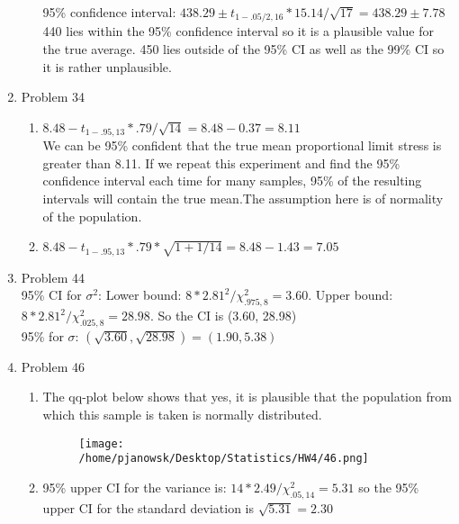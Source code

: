 \documentclass[11pt,letterpaper]{article}
\begin{document}
\begin{enumerate}
\begin{enumerate}
        95\% confidence interval: $438.29\pm t_{1-.05/2,16}*15.14/\sqrt{17} = 438.29\pm 7.78$\\
        440 lies within the 95\% confidence interval so it is a plausible value for the true average. 450 lies outside of the 95\% CI as well as the 99\% CI so it is rather unplausible.
    \end{enumerate}
\item Problem 34\\
    \begin{enumerate}
        \item $8.48- t_{1-.95,13}*.79/\sqrt{14} = 8.48-0.37 = 8.11$\\
        We can be 95\% confident that the true mean proportional limit stress is greater than 8.11. If we repeat this experiment and find the 95\% confidence interval each time for many samples, 95\% of the resulting intervals will contain the true mean.The assumption here is of normality of the population.
        \item $8.48- t_{1-.95,13}*.79*\sqrt{1+1/14} = 8.48-1.43 = 7.05$\\
    \end{enumerate}
\item Problem 44 \\
95\% CI for $\sigma^2$: Lower bound: $8*2.81^2/\chi^2_{.975,8}=3.60.$ Upper bound: $8*2.81^2/\chi^2_{.025,8}=28.98.$ So the CI is (3.60, 28.98)\\
95\% for $\sigma$: $(\sqrt{3.60},\sqrt{28.98})=(1.90,5.38)$
\item Problem 46 \\
    \begin{enumerate}
        \item  The qq-plot below shows that yes, it is plausible that the population from which this sample is taken is normally distributed.
                \begin{figure}[H]
                    \centering
                    \texttt{[image: /home/pjanowsk/Desktop/Statistics/HW4/46.png]}
                \end{figure}
        \item 95\% upper CI for the variance is: $14*2.49/\chi^2_{.05,14}=5.31$ so the 95\% upper CI for the standard deviation is $\sqrt{5.31}=2.30$
    \end{enumerate}
\end{enumerate}
\end{document}
